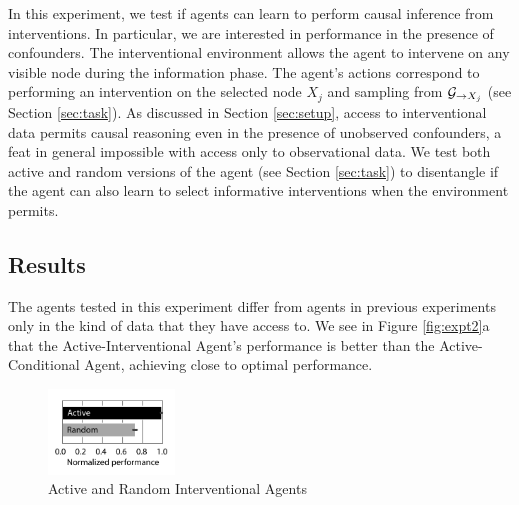 In this experiment, we test if agents can learn to perform causal inference from interventions. In particular, we are interested in performance in the presence of confounders. The interventional environment allows the agent to intervene on any visible node during the information phase. The agent's actions correspond to performing an intervention on the selected node $X_j$ and sampling from ${\cal G}_{\rightarrow X_j}$ (see Section \ref{sec:task}). As discussed in Section \ref{sec:setup}, access to interventional data permits causal reasoning even in the presence of unobserved confounders, a feat in general impossible with access only to observational data. We test both active and random versions of the agent (see Section \ref{sec:task}) to disentangle if the agent can also learn to select informative interventions when the environment permits.

\subsection{Results}

The agents tested in this experiment differ from agents in previous experiments only in the kind of data that they have access to. We see in Figure \ref{fig:expt2}a that the Active-Interventional Agent's performance is better than the Active-Conditional Agent, achieving close to optimal performance. 

\begin{figure}[h]
\centering
\includegraphics[width=0.3\textwidth , trim = {0 0cm 0 0.9cm}]{figures/fig_causal_act_v_pass.pdf} 
\caption{Active and Random Interventional Agents}
\label{fig:expt2_active}
\end{figure}

